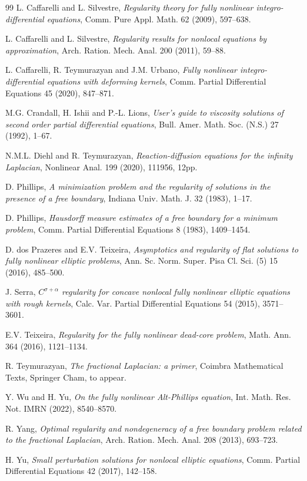 \documentclass[11pt,reqno]{amsart}
\numberwithin{equation}{section}
\numberwithin{theorem}{section}
\numberwithin{lemma}{section}
\numberwithin{corollary}{section}
\numberwithin{remark}{section}
\numberwithin{proposition}{section}
\numberwithin{definition}{section}
\begin{document}
\begin{thebibliography}{99}
 L. Caffarelli and L. Silvestre, 
\textit{Regularity theory for fully nonlinear integro-differential equations}, 
Comm. Pure Appl. Math. 62 (2009), 597--638.

 L. Caffarelli and L. Silvestre, 
\textit{Regularity results for nonlocal equations by approximation}, 
Arch. Ration. Mech. Anal. 200 (2011), 59--88.

 L. Caffarelli, R. Teymurazyan and J.M. Urbano, 
\textit{Fully nonlinear integro-differential equations with deforming kernels}, 
Comm. Partial Differential Equations 45 (2020), 847--871.

 M.G. Crandall, H. Ishii and P.-L. Lions, 
\textit{User's guide to viscosity solutions of second order partial differential equations}, 
Bull. Amer. Math. Soc. (N.S.) 27 (1992), 1--67.

 N.M.L. Diehl and R. Teymurazyan, 
\textit{Reaction-diffusion equations for the infinity Laplacian}, 
Nonlinear Anal. 199 (2020), 111956, 12pp.

 D. Phillips, 
\textit{A minimization problem and the regularity of solutions in the presence of a free boundary}, 
Indiana Univ. Math. J. 32 (1983), 1--17.

 D. Phillips, 
\textit{Hausdorff measure estimates of a free boundary for a minimum problem}, 
Comm. Partial Differential Equations 8 (1983), 1409--1454.

 D. dos Prazeres and E.V. Teixeira, 
\textit{Asymptotics and regularity of flat solutions to fully nonlinear elliptic problems}, 
Ann. Sc. Norm. Super. Pisa Cl. Sci. (5) 15 (2016), 485--500.     

 J. Serra, 
\textit{$C^{\sigma+\alpha}$ regularity for concave nonlocal fully nonlinear elliptic equations with rough kernels}, 
Calc. Var. Partial Differential Equations 54 (2015), 3571--3601.

 E.V. Teixeira, 
\textit{Regularity for the fully nonlinear dead-core problem}, 
Math. Ann. 364 (2016), 1121--1134.

 R. Teymurazyan, 
\textit{The fractional Laplacian: a primer}, 
Coimbra Mathematical Texts, Springer Cham, to appear.

 Y. Wu and H. Yu, 
\textit{On the fully nonlinear Alt-Phillips equation}, 
Int. Math. Res. Not. IMRN (2022), 8540--8570.

 R. Yang, 
\textit{Optimal regularity and nondegeneracy of a free boundary problem related to the fractional Laplacian}, 
Arch. Ration. Mech. Anal. 208 (2013), 693--723.

 H. Yu, 
\textit{Small perturbation solutions for nonlocal elliptic equations}, 
Comm. Partial Differential Equations 42 (2017), 142--158.

\end{thebibliography}
\end{document}
